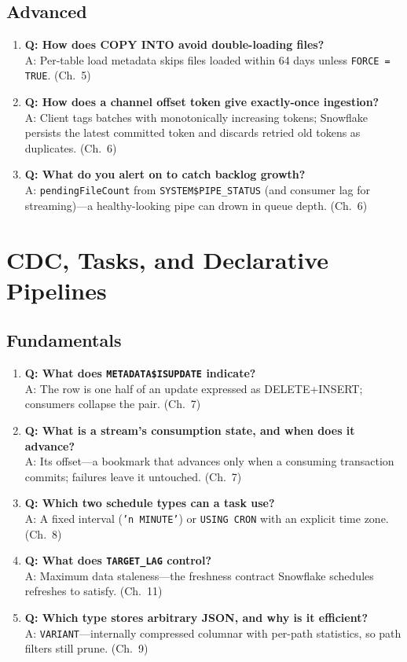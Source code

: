 \subsection{Advanced}
\begin{enumerate}
    \item \textbf{Q: How does COPY INTO avoid double-loading files?}\\
    A: Per-table load metadata skips files loaded within 64 days unless \texttt{FORCE = TRUE}. (Ch.~5)
    \item \textbf{Q: How does a channel offset token give exactly-once ingestion?}\\
    A: Client tags batches with monotonically increasing tokens; Snowflake persists the latest committed token and discards retried old tokens as duplicates. (Ch.~6)
    \item \textbf{Q: What do you alert on to catch backlog growth?}\\
    A: \texttt{pendingFileCount} from \texttt{SYSTEM\$PIPE\_STATUS} (and consumer lag for streaming)---a healthy-looking pipe can drown in queue depth. (Ch.~6)
\end{enumerate}

\section{CDC, Tasks, and Declarative Pipelines}

\subsection{Fundamentals}
\begin{enumerate}
    \item \textbf{Q: What does \texttt{METADATA\$ISUPDATE} indicate?}\\
    A: The row is one half of an update expressed as DELETE+INSERT; consumers collapse the pair. (Ch.~7)
    \item \textbf{Q: What is a stream's consumption state, and when does it advance?}\\
    A: Its offset---a bookmark that advances only when a consuming transaction commits; failures leave it untouched. (Ch.~7)
    \item \textbf{Q: Which two schedule types can a task use?}\\
    A: A fixed interval (\texttt{'n MINUTE'}) or \texttt{USING CRON} with an explicit time zone. (Ch.~8)
    \item \textbf{Q: What does \texttt{TARGET\_LAG} control?}\\
    A: Maximum data staleness---the freshness contract Snowflake schedules refreshes to satisfy. (Ch.~11)
    \item \textbf{Q: Which type stores arbitrary JSON, and why is it efficient?}\\
    A: \texttt{VARIANT}---internally compressed columnar with per-path statistics, so path filters still prune. (Ch.~9)
\end{enumerate}

